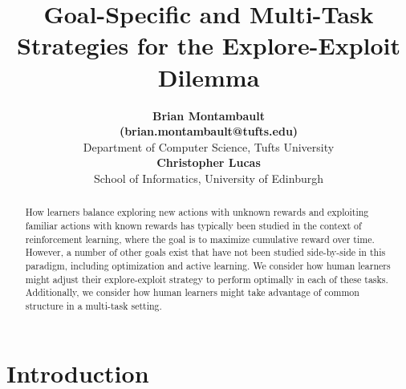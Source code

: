 \documentclass[10pt,letterpaper]{article}
\title{Goal-Specific and Multi-Task Strategies for the Explore-Exploit Dilemma}
\author{\textbf{Brian Montambault} \\\textbf{(brian.montambault@tufts.edu)}
\\ Department of Computer Science, Tufts University
\\\textbf{Christopher Lucas} \\ School of Informatics, University of Edinburgh}
\begin{document}
	
	\maketitle
	
	
	\begin{abstract}
		
	How learners balance exploring new actions with unknown rewards and exploiting familiar actions with known rewards has typically been studied in the context of reinforcement learning, where the goal is to maximize cumulative reward over time. However, a number of other goals exist that have not been studied side-by-side in this paradigm, including optimization and active learning. We consider how human learners might adjust their explore-exploit strategy to perform optimally in each of these tasks. Additionally, we consider how human learners might take advantage of common structure in a multi-task setting.
	\end{abstract}
	
	\section{Introduction}
	
\end{document}
